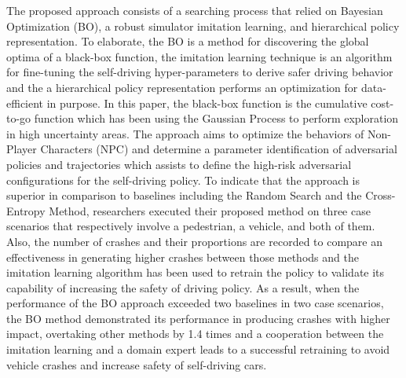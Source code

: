 \documentclass[10pt,a4paper]{report}
\begin{document}
The proposed approach consists of a searching process that relied on Bayesian Optimization (BO), a robust simulator imitation learning, and hierarchical policy representation.
%
To elaborate, the BO is a method for discovering the global optima of a black-box function, the imitation learning technique is an algorithm for fine-tuning the self-driving hyper-parameters to derive safer driving behavior and the a hierarchical policy representation performs an optimization for data-efficient in purpose.
%
In this paper, the black-box function is the cumulative cost-to-go function which has been using the Gaussian Process to perform exploration in high uncertainty areas.
%
The approach aims to optimize the behaviors of Non-Player Characters (NPC)
%
and determine a parameter identification of adversarial policies and trajectories which assists to define the high-risk adversarial configurations for the self-driving policy. 
% 
To indicate that the approach is superior in comparison to baselines including the Random Search and the Cross-Entropy Method, researchers executed their proposed method on three case scenarios that respectively involve a pedestrian, a vehicle, and both of them.
%
Also, the number of crashes and their proportions are recorded to compare an effectiveness in generating higher crashes between those methods and
%
the imitation learning algorithm has been used to retrain the policy to validate its capability of increasing the safety of driving policy.
%
As a result, when the performance of the BO approach exceeded two baselines in two case scenarios, the BO method demonstrated its performance in producing crashes with higher impact, overtaking other methods by 1.4 times and a cooperation between the imitation learning and a domain expert leads to a successful retraining to avoid vehicle crashes and increase safety of self-driving cars.
\end{document}
